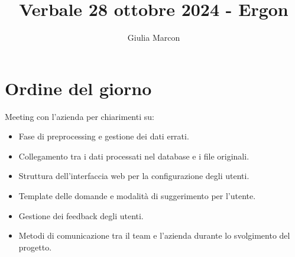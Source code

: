 \documentclass{TWReport}
\title{Verbale 28 ottobre 2024 - Ergon}
\author{Giulia Marcon}
\begin{document}
\frontmatter

\showPartecipants

\section*{Ordine del giorno}
Meeting con l'azienda per chiarimenti su:
\begin{itemize}
    \item Fase di preprocessing e gestione dei dati errati.
    \item Collegamento tra i dati processati nel database e i file originali.
    \item Struttura dell'interfaccia web per la configurazione degli utenti.
    \item Template delle domande e modalità di suggerimento per l’utente.
    \item Gestione dei feedback degli utenti.
    \item Metodi di comunicazione tra il team e l'azienda durante lo svolgimento del progetto.
\end{itemize}
\end{document}
